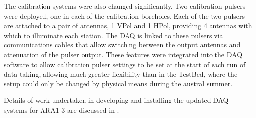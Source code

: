 The calibration systems were also changed significantly. Two calibration pulsers were deployed, one in each of the calibration boreholes. Each of the two pulsers are attached to a pair of antennas, 1 VPol and 1 HPol, providing 4 antennas with which to illuminate each station. The DAQ is linked to these pulsers via communications cables that allow switching between the output antennas and attenuation of the pulser output. These features were integrated into the DAQ software to allow calibration pulser settings to be set at the start of each run of data taking, allowing much greater flexibility than in the TestBed, where the setup could only be changed by physical means during the austral summer.


Details of work undertaken in developing and installing the updated DAQ systems for ARA1-3 are discussed in .

%
%





